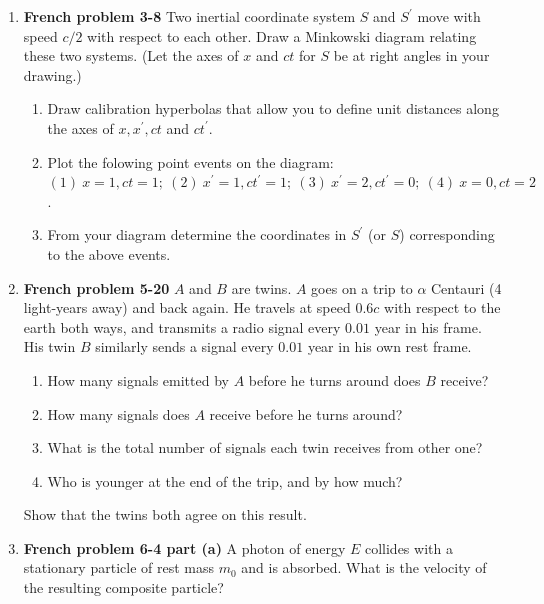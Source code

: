 \documentclass[fleqn]{article}
\begin{document}
  \begin{enumerate}
    \item \textbf{French problem 3-8} 
    Two inertial coordinate system $S$ and $S^'$ move with speed $c/2$ with 
    respect to each other. Draw a Minkowski diagram relating these two 
    systems. (Let the axes of $x$ and $ct$ for $S$ be at right angles in your drawing.)
    \begin{enumerate}
      \item Draw calibration hyperbolas that allow you to define unit distances along the axes of $x, x^', ct$ and $ct^'$.

      \item Plot the folowing point events on the diagram: $(1) ~ x=1, ct=1; ~ (2) ~ x^'=1, ct^'=1; ~ (3) ~ x^'=2, ct^'=0; ~ (4) ~ x=0, ct=2$.


      \item From your diagram determine the coordinates in $S^'$ (or $S$) corresponding to the above events.
      
    \end{enumerate}


    \item \textbf{French problem 5-20} $A$ and $B$ are twins. $A$ goes on a trip to $\alpha$ Centauri (4 light-years away) and back again.
    He travels at speed $0.6c$ with respect to the earth both ways, and transmits a radio signal every $0.01$ year in his frame.
    His twin $B$ similarly sends a signal every $0.01$ year in his own rest frame. 

    \begin{enumerate}
      \item How many signals emitted by $A$ before he turns around does $B$ receive?
      
      \item How many signals does $A$ receive before he turns around?
      
      \item What is the total number of signals each twin receives from other one?
      
      \item Who is younger at the end of the trip, and by how much? 
    \end{enumerate}
    Show that the twins both agree on this result.
    

    \item \textbf{French problem 6-4 part (a)} A photon of energy $E$ collides with a stationary particle of rest mass $m_0$ and 
    is absorbed. What is the velocity of the resulting composite particle?
    

  \end{enumerate}
\end{document}
